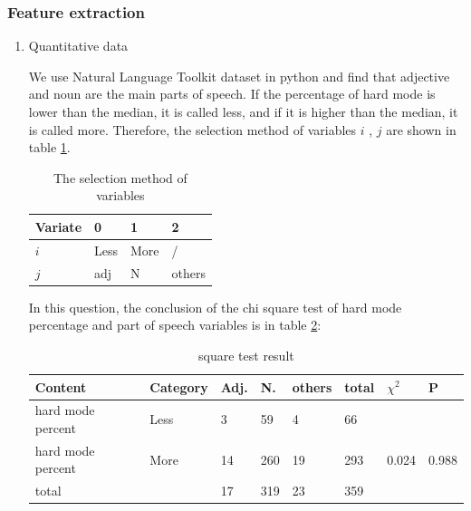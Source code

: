 \documentclass[
  journal=medium,
  manuscript=Report,
  year=2023,
  volume=37,
]{cup-journal}
\begin{document}
\subsubsection{Feature extraction}
\begin{enumerate}
    \item  Quantitative data 
    
    We use Natural Language Toolkit dataset in python and find that adjective and noun are the main parts of speech. If the percentage of hard mode is lower than the median, it is called less, and if it is higher than the median, it is called more. Therefore, the selection method of variables $i$ , $j$ are shown in table \ref{variables}.

    \begin{table}[hbt!]
        \begin{threeparttable}
        \caption{The selection method of variables}
        \label{variables}
        \begin{tabular}{llll}
        \toprule
        \headrow Variate & 0 & 1 & 2 \\ 
        \midrule
        $i$ & Less & More & /\\ 
        \midrule
        $j$ & adj & N & others\\ 
        \bottomrule 
        \end{tabular}
        \end{threeparttable}
    \end{table}

    In this question, the conclusion of the chi square test of hard mode percentage and part of speech variables is in table \ref{square test result}: 

    \begin{table}[hbt!]
        \begin{threeparttable}
        \caption{square test result}
        \label{square test result}
        \begin{tabular}{llllllll}
        \toprule
        \headrow Content & Category & Adj. & N. & others & total & $\chi^2$ & P \\ 
        \midrule
        hard mode percent & Less & 3 & 59 & 4 & 66 &  & \\ 
        \midrule
        hard mode percent & More & 14 & 260 & 19 & 293 & 0.024 & 0.988\\ 
        \midrule
        total &  & 17 & 319 & 23 & 359 &  & \\ 
        \bottomrule 
        \end{tabular}
        \end{threeparttable}
    \end{table}


\end{enumerate}
\end{document}
